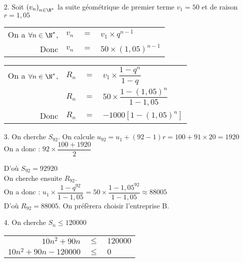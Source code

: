 \begin{itemize}
\item[2.] Soit $\left(v_n\right)_{n\in \N^*}$ la suite géométrique de premier terme $v_1 = 50$ et de raison $r = 1,05$ \\

\begin{tabular}{rrll}
On a $\forall n \in \N^*$, & $v_n$ & $ =$ & $ v_1 \times q^{n-1}$ \\
Donc & $v_n$ & $=$ & $50 \times \left(1,05\right)^{n-1}$ \\
\end{tabular}

\vspace*{.3cm} 

\begin{tabular}{rrll}
On a $\forall n \in \N^*$, & $R_n$ & $ = $ & $ v_1\times \dfrac{1-q^n}{1-q}$ \vspace*{.3cm} \\
& $R_n$ & $=$ & $50 \times \dfrac{1-\left(1,05\right)^{n}}{1- 1,05}$ \vspace*{.3cm} \\
Donc & $R_n$ & $=$ & $-1000\left[1 - \left(1,05\right)^n\right]$ \vspace*{.3cm} \\
\end{tabular}

\item[3.] On cherche $S_{92}$. On calcule $u_{92} = u_1 + \left(92-1\right)r = 100 + 91\times 20 = 1920$ \\

On a donc : $92 \times \dfrac{100 + 1920}{2}$

D'où $S_{92} = 92920$ \\

On cherche ensuite $R_{92}$. \\

On a donc : $u_1 \times \dfrac{1 - q^{92}}{1 - 1,05} = 50 \times \dfrac{1-1,05^{92}}{1-1,05} \approx 88005$ \\

D'où $R_{92} = 88005$. On préfèrera choisir l'entreprise B. \\

\item[4.] On cherche $S_n \leqslant 120 000$ \\

\begin{tabular}{rll}
$10n^2 + 90n$ & $ \leqslant $ & $ 120 000$ \\
$10n^2 + 90n - 120 000$ & $ \leqslant $ & $0$ \\
\end{tabular}


\end{itemize}
